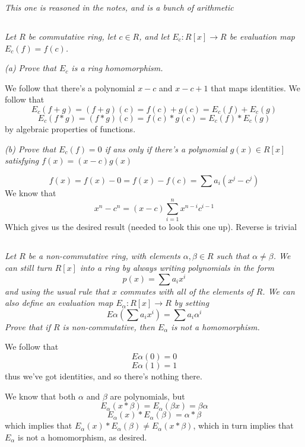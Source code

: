 \documentclass[11pt,oneside,titlepage]{book}
\begin{document}
\textit{This one is reasoned in the notes, and is a bunch of
arithmetic}

\subsection{}

\textit{Let $R$ be commutative ring, let $c \in R$, and let $E_c: R[x]
\to R$ be evaluation map $E_c(f) = f(c)$.}

\textit{(a) Prove that $E_c$ is a ring homomorphism.}

We follow that there's a polynomial $x - c$ and $x - c + 1$ that maps
identities.  We follow that
$$E_c(f + g) = (f + g)(c) = f(c) + g(c) = E_c(f) + E_c(g)$$
$$E_c(f * g) = (f * g)(c) = f(c) * g(c) = E_c(f) * E_c(g)$$
by algebraic properties of functions.

\textit{(b) Prove that $E_c(f) = 0$ if ans only if there's a
polynomial $g(x) \in R[x]$ satisfying $f(x) = (x - c)g(x)$}

$$f(x) = f(x) - 0 = f(x) - f(c) = \sum{a_i (x^j - c^j)}$$
We know that
$$x^n - c^n = (x - c)\sum_{i = 1}^n{x^{n - i} c^{i - 1}}$$
Which gives us the desired result (needed to look this one up).
Reverse is trivial

\subsection{}

\textit{Let $R$ be a non-commutative ring, with elements $\alpha,
\beta \in R$ such that $\alpha \neq \beta$. We can still turn $R[x]$
into a ring by always writing polynomials in the form
  $$p(x) = \sum{a_i x^i}$$
  and using the usual rule that $x$ commutes with all of the elements
of $R$.  We can also define an evaluation map $E_\alpha: R[x] \to R$
by setting
  $$E\alpha(\sum{a_i x^i}) = \sum{a_i \alpha^i}$$
  Prove that if $R$ is non-commutative, then $E_\alpha$ is not a
homomorphism.}

We follow that
$$E\alpha(0) = 0$$
$$E\alpha(1) = 1$$
thus we've got identities, and so there's nothing there.

We know that both $\alpha$ and $\beta$ are polynomials, but
$$E_\alpha(x * \beta) = E_\alpha(\beta x) = \beta \alpha$$
$$E_\alpha(x) * E_\alpha(\beta) = \alpha * \beta$$
which implies that $E_\alpha(x) * E_\alpha(\beta) \neq E_\alpha(x *
\beta)$, which in turn implies that $E_\alpha$ is not a homomorphism,
as desired.

\subsection{}
\end{document}
